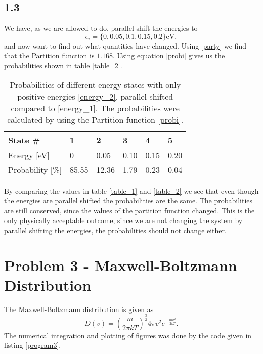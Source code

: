 \documentclass[a4paper,10pt, english]{article}
\begin{document}
\subsection*{1.3}
We have, as we are allowed to do, parallel shift the energies to
\begin{equation}
    \epsilon_i = \{0, 0.05, 0.1, 0.15, 0.2\} \text{eV}, \label{energy_2}
\end{equation}
and now want to find out what quantities have changed. Using \eqref{party}
we find that the Partition function is $1.168$.
Using equation \eqref{probi} gives us the probabilities shown in table \vref{table_2}.
\begin{table}[]
    \begin{center}
    \caption{Probabilities of different energy states with only positive energies \eqref{energy_2}, parallel shifted compared to \eqref{energy_1}. The probabilities were calculated by using the Partition function \eqref{probi}.}    \begin{tabular}{@{}llllll@{}}
    \toprule
    State \#                & 1     & 2     & 3    & 4    & 5    \\ \midrule
    Energy {[}eV{]}      & 0 & 0.05 & 0.10    & 0.15 & 0.20 \\
    Probability {[}\%{]} & 85.55 & 12.36 & 1.79 & 0.23 & 0.04 \\ \bottomrule
    \end{tabular}
    \label{table_2}
    \end{center}
\end{table}
By comparing the values in table \vref{table_1}
and \vref{table_2} we see that even though the energies are parallel shifted the probabilities are the same. The probabilities are still conserved, since the values of the partition function changed. This is the only physically acceptable outcome, since we are not changing the system by parallel shifting the energies, the probabilities should not change either.


\section*{Problem 3 - Maxwell-Boltzmann Distribution}
The Maxwell-Boltzmann distribution is given as
\begin{equation}
    D(v) = \left(\frac{m}{2\pi kT}\right)^{\frac{3}{2}}4\pi v^2e^{-\frac{mv^2}{2kT}}.
\end{equation}
The numerical integration and plotting of figures was done by the code given in listing \vref{program3}.
\end{document}
